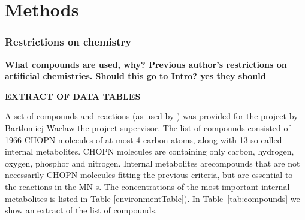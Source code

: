 \documentclass[a4paper,12pt]{article}
\begin{document}
	
\section{Methods}
\label{sec:methods}

\subsubsection{Restrictions on chemistry}
\label{ssub:Restrictions on chemistry}
\textbf{
What compounds are used, why?
Previous author's restrictions on artificial chemistries. Should this go to Intro? yes they should }

\textbf{EXTRACT OF DATA TABLES}

	A set of compounds and reactions (as used by \cite[]{BartekLower}) was provided for the project by Bartlomiej Waclaw the project supervisor. The list of compounds consisted of 1966 CHOPN molecules of at most 4 carbon atoms, along with 13 so called internal metabolites. CHOPN molecules are containing only carbon, hydrogen, oxygen, phosphor and nitrogen.  Internal metabolites arecompounds that are not necessarily CHOPN molecules fitting the previous criteria, but are essential to the reactions in the MN-s. The concentrations of the most important internal metabolites is listed in Table \ref{environmentTable}).  In Table~\ref{tab:compounds} we show an extract of the list of compounds.
	
\end{document}

